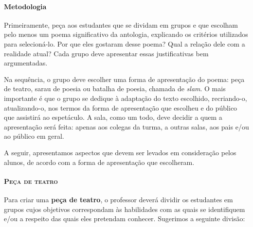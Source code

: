 \documentclass[11pt]{extarticle}
\begin{document}
\paragraph{Metodologia}

Primeiramente, peça aos estudantes que se dividam em grupos e que
escolham pelo menos um poema significativo da antologia, explicando os
critérios utilizados para selecioná-lo. Por que eles gostaram desse
poema? Qual a relação dele com a realidade atual? Cada grupo deve
apresentar essas justificativas bem argumentadas.

Na sequência, o grupo deve escolher uma forma de apresentação do poema:
peça de teatro, sarau de poesia ou batalha de poesia, chamada de
\emph{slam}. O mais importante é que o grupo se dedique à adaptação do
texto escolhido, recriando-o, atualizando-o, nos termos da forma de
apresentação que escolheu e do público que assistirá ao espetáculo. A
sala, como um todo, deve decidir a quem a apresentação será feita:
apenas aos colegas da turma, a outras salas, aos pais e/ou ao público em
geral.

A seguir, apresentamos aspectos que devem ser levados em consideração
pelos alunos, de acordo com a forma de apresentação que escolheram.

\paragraph{\textsc{Peça de teatro}}

Para criar uma \textbf{peça de teatro}, o professor deverá dividir os
estudantes em grupos cujos objetivos correspondam às habilidades com as
quais se identifiquem e/ou a respeito das quais eles pretendam conhecer.
Sugerimos a seguinte divisão:
\end{document}
